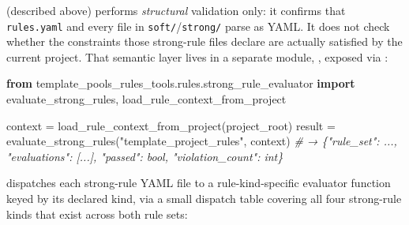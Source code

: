 \documentclass[
]{article}
\newenvironment{Shaded}{}{}
\newcommand{\CommentTok}[1]{\textcolor[rgb]{0.38,0.63,0.69}{\textit{#1}}}
\newcommand{\ImportTok}[1]{\textcolor[rgb]{0.00,0.50,0.00}{\textbf{#1}}}
\newcommand{\NormalTok}[1]{#1}
\newcommand{\OperatorTok}[1]{\textcolor[rgb]{0.40,0.40,0.40}{#1}}
\newcommand{\StringTok}[1]{\textcolor[rgb]{0.25,0.44,0.63}{#1}}
\begin{document}
 (described above) performs
\emph{structural} validation only: it confirms that \texttt{rules.yaml}
and every file in \texttt{soft/}/\texttt{strong/} parse as YAML. It does
not check whether the constraints those strong-rule files declare are
actually satisfied by the current project. That semantic layer lives in
a separate module,
,
exposed via :

\begin{Shaded}
\begin{Highlighting}[]
\ImportTok{from}\NormalTok{ template\_pools\_rules\_tools.rules.strong\_rule\_evaluator }\ImportTok{import}\NormalTok{ evaluate\_strong\_rules, load\_rule\_context\_from\_project}

\NormalTok{context }\OperatorTok{=}\NormalTok{ load\_rule\_context\_from\_project(project\_root)}
\NormalTok{result }\OperatorTok{=}\NormalTok{ evaluate\_strong\_rules(}\StringTok{"template\_project\_rules"}\NormalTok{, context)}
\CommentTok{\# → \{"rule\_set": ..., "evaluations": [...], "passed": bool, "violation\_count": int\}}
\end{Highlighting}
\end{Shaded}

 dispatches each strong-rule YAML file
to a rule-kind-specific evaluator function keyed by its declared kind,
via a small dispatch table covering all four strong-rule kinds that
exist across both rule sets:
\end{document}
